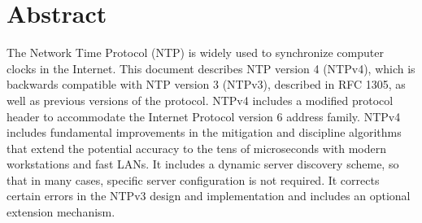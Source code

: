 \section*{Abstract}

The Network Time Protocol (NTP) is widely used to synchronize
computer clocks in the Internet. This document describes NTP version
4 (NTPv4), which is backwards compatible with NTP version 3 (NTPv3),
described in RFC 1305, as well as previous versions of the protocol.
NTPv4 includes a modified protocol header to accommodate the Internet
Protocol version 6 address family. NTPv4 includes fundamental
improvements in the mitigation and discipline algorithms that extend
the potential accuracy to the tens of microseconds with modern
workstations and fast LANs. It includes a dynamic server discovery
scheme, so that in many cases, specific server configuration is not
required. It corrects certain errors in the NTPv3 design and
implementation and includes an optional extension mechanism.
